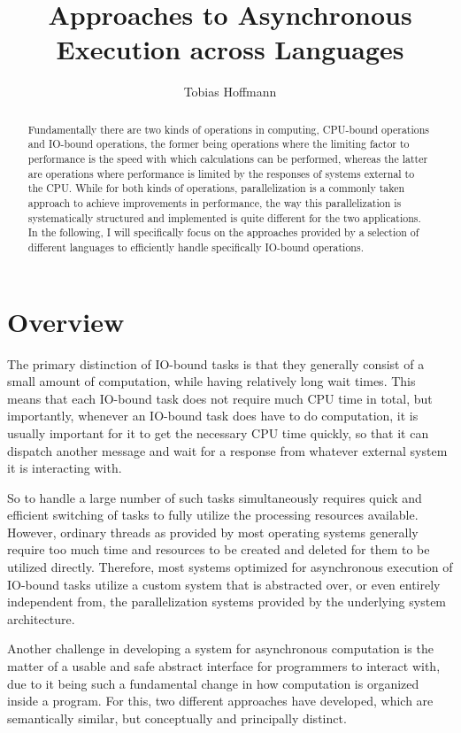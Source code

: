 \documentclass[a4paper,UKenglish,cleveref, autoref, thm-restate]{lipics-v2021}
\title{Approaches to Asynchronous Execution across Languages}
\author{Tobias Hoffmann}{Albert-Ludwigs-Universität Freiburg, Germany}{garbaz@t-online.de}{}{}
\begin{document}
\maketitle

\begin{abstract}
    Fundamentally there are two kinds of operations in computing, CPU-bound operations and IO-bound operations, the former being operations where the limiting factor to performance is the speed with which calculations can be performed, whereas the latter are operations where performance is limited by the responses of systems external to the CPU. While for both kinds of operations, parallelization is a commonly taken approach to achieve improvements in performance, the way this parallelization is systematically structured and implemented is quite different for the two applications. In the following, I will specifically focus on the approaches provided by a selection of different languages to efficiently handle specifically IO-bound operations.
\end{abstract}

\section{Overview}
\label{sec:overview}

The primary distinction of IO-bound tasks is that they generally consist of a small amount of computation, while having relatively long wait times. This means that each IO-bound task does not require much CPU time in total, but importantly, whenever an IO-bound task does have to do computation, it is usually important for it to get the necessary CPU time quickly, so that it can dispatch another message and wait for a response from whatever external system it is interacting with.

So to handle a large number of such tasks simultaneously requires quick and efficient switching of tasks to fully utilize the processing resources available. However, ordinary threads as provided by most operating systems generally require too much time and resources to be created and deleted for them to be utilized directly. Therefore, most systems optimized for asynchronous execution of IO-bound tasks utilize a custom system that is abstracted over, or even entirely independent from, the parallelization systems provided by the underlying system architecture.

Another challenge in developing a system for asynchronous computation is the matter of a usable and safe abstract interface for programmers to interact with, due to it being such a fundamental change in how computation is organized inside a program. For this, two different approaches have developed, which are semantically similar, but conceptually and principally distinct.
\end{document}
